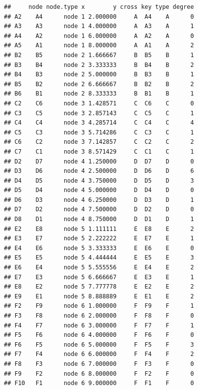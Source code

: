 \documentclass[
]{article}
\newenvironment{Shaded}{\begin{snugshade}}{\end{snugshade}}
\newcommand{\CommentTok}[1]{\textcolor[rgb]{0.56,0.35,0.01}{\textit{#1}}}
\newcommand{\KeywordTok}[1]{\textcolor[rgb]{0.13,0.29,0.53}{\textbf{#1}}}
\newcommand{\NormalTok}[1]{#1}
\newcommand{\OperatorTok}[1]{\textcolor[rgb]{0.81,0.36,0.00}{\textbf{#1}}}
\newcommand{\StringTok}[1]{\textcolor[rgb]{0.31,0.60,0.02}{#1}}
\begin{document}
\begin{verbatim}
##     node node.type x        y cross key type degree
## A2    A4      node 1 2.000000     A  A4    A      0
## A3    A3      node 1 4.000000     A  A3    A      1
## A4    A2      node 1 6.000000     A  A2    A      0
## A5    A1      node 1 8.000000     A  A1    A      2
## B2    B5      node 2 1.666667     B  B5    B      1
## B3    B4      node 2 3.333333     B  B4    B      2
## B4    B3      node 2 5.000000     B  B3    B      1
## B5    B2      node 2 6.666667     B  B2    B      2
## B6    B1      node 2 8.333333     B  B1    B      1
## C2    C6      node 3 1.428571     C  C6    C      0
## C3    C5      node 3 2.857143     C  C5    C      1
## C4    C4      node 3 4.285714     C  C4    C      4
## C5    C3      node 3 5.714286     C  C3    C      1
## C6    C2      node 3 7.142857     C  C2    C      2
## C7    C1      node 3 8.571429     C  C1    C      1
## D2    D7      node 4 1.250000     D  D7    D      0
## D3    D6      node 4 2.500000     D  D6    D      6
## D4    D5      node 4 3.750000     D  D5    D      3
## D5    D4      node 4 5.000000     D  D4    D      0
## D6    D3      node 4 6.250000     D  D3    D      1
## D7    D2      node 4 7.500000     D  D2    D      0
## D8    D1      node 4 8.750000     D  D1    D      1
## E2    E8      node 5 1.111111     E  E8    E      2
## E3    E7      node 5 2.222222     E  E7    E      1
## E4    E6      node 5 3.333333     E  E6    E      0
## E5    E5      node 5 4.444444     E  E5    E      3
## E6    E4      node 5 5.555556     E  E4    E      2
## E7    E3      node 5 6.666667     E  E3    E      1
## E8    E2      node 5 7.777778     E  E2    E      2
## E9    E1      node 5 8.888889     E  E1    E      2
## F2    F9      node 6 1.000000     F  F9    F      1
## F3    F8      node 6 2.000000     F  F8    F      0
## F4    F7      node 6 3.000000     F  F7    F      1
## F5    F6      node 6 4.000000     F  F6    F      0
## F6    F5      node 6 5.000000     F  F5    F      3
## F7    F4      node 6 6.000000     F  F4    F      2
## F8    F3      node 6 7.000000     F  F3    F      0
## F9    F2      node 6 8.000000     F  F2    F      0
## F10   F1      node 6 9.000000     F  F1    F      0
\end{verbatim}

\begin{Shaded}
\end{Shaded}
\end{document}
